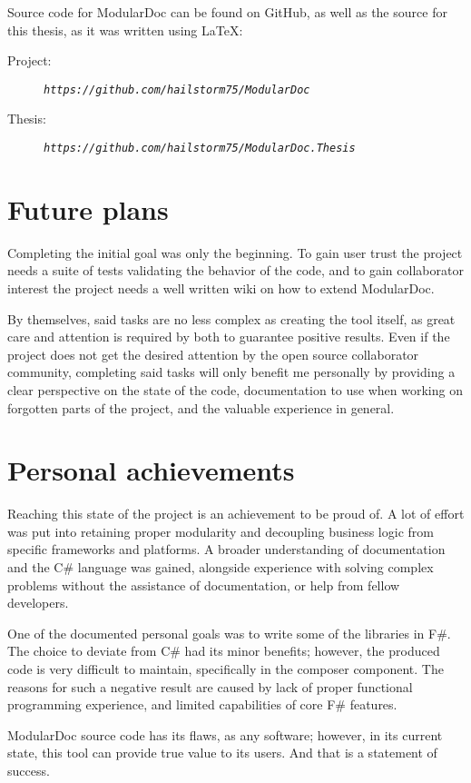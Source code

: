 Source code for ModularDoc can be found on GitHub, as well as the source for this thesis, as it was written using \LaTeX:
\begin{description}
    \item[Project:] \textit{\nolinkurl{https://github.com/hailstorm75/ModularDoc}}
    \item[Thesis:] \textit{\nolinkurl{https://github.com/hailstorm75/ModularDoc.Thesis}}
\end{description}

\section*{Future plans}

Completing the initial goal was only the beginning. To gain user trust the project needs a suite of tests validating the behavior of the code, and to gain collaborator interest the project needs a well written wiki on how to extend ModularDoc.

By themselves, said tasks are no less complex as creating the tool itself, as great care and attention is required by both to guarantee positive results. Even if the project does not get the desired attention by the open source collaborator community, completing said tasks will only benefit me personally by providing a clear perspective on the state of the code, documentation to use when working on forgotten parts of the project, and the valuable experience in general.

\section*{Personal achievements}

Reaching this state of the project is an achievement to be proud of. A lot of effort was put into retaining proper modularity and decoupling business logic from specific frameworks and platforms. A broader understanding of documentation and the C\# language was gained, alongside experience with solving complex problems without the assistance of documentation, or help from fellow developers.

One of the documented personal goals was to write some of the libraries in F\#. The choice to deviate from C\# had its minor benefits; however, the produced code is very difficult to maintain, specifically in the composer component. The reasons for such a negative result are caused by lack of proper functional programming experience, and limited capabilities of core F\# features.

ModularDoc source code has its flaws, as any software; however, in its current state, this tool can provide true value to its users. And that is a statement of success.